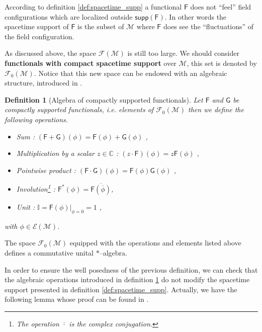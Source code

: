 \documentclass[11pt]{book}
\newcommand{\supp}{\mathsf{supp}}
\newcommand{\Ecal}{\mathcal{E}}
\newcommand{\Fcal}{\mathcal{F}}
\newcommand{\Mcal}{\mathcal{M}}
\newcommand{\Cbb}{\mathbb{C}}
\newcommand{\Ibb}{\mathbb{I}}
\newcommand{\Fsf}{\mathsf{F}}
\newcommand{\Gsf}{\mathsf{G}}
\theoremstyle{break}
\newtheorem{definition}{Definition}[chapter]
\begin{document}
According to definition \ref{def:spacetime_supp} a functional $\Fsf$ does not ``feel'' field configurations which are localized outside $\supp(\Fsf)$. In other words the spacetime support of $\Fsf$ is the subset of $\Mcal$ where $\Fsf$ does see the ``fluctuations'' of the field configuration.


As discussed above, the space $\Fcal(\Mcal)$ is still too large. We should consider \textbf{functionals with compact spacetime support} over $\Mcal$, this set is denoted by $\Fcal_0(\Mcal)$. Notice that this new space can be endowed with an algebraic structure, introduced in \cite{BFLR_2012}.


\begin{definition}[Algebra of compactly supported functionals] \label{def:algebra_comp_supp_func}
Let $\Fsf$ and $\Gsf$ be compactly supported functionals, i.e. elements of $\Fcal_0(\Mcal)$ then we define the following operations.
%
\begin{itemize}
\item Sum : $(\Fsf+\Gsf)(\phi) = \Fsf(\phi) + \Gsf(\phi)$ ,
\item Multiplication by a scalar $z\in\Cbb$ : $(z \cdot \Fsf)(\phi) = z \Fsf(\phi)$ ,
\item Pointwise product : $(\Fsf \cdot \Gsf)(\phi) = \Fsf(\phi) \Gsf(\phi)$ ,
\item Involution\footnote{The operation $\overline{\cdot}$ is the complex conjugation.} : $\Fsf^\ast(\phi) = \overline{\Fsf(\overline{\phi})}$,
\item Unit : $\Ibb = \Fsf(\phi)\bigg\vert_{\phi=0} = 1$ ,
\end{itemize}
%
with $\phi \in \Ecal(\Mcal)$. 
\end{definition}


The space $\Fcal_0(\Mcal)$ equipped with the operations and elements listed above defines a commutative unital $\ast$--algebra.


In order to ensure the well posedness of the previous definition, we can check that the algebraic operations introduced in definition \ref{def:algebra_comp_supp_func} do not modify the spacetime support presented in definition \ref{def:spacetime_supp}. Actually, we have the following lemma whose proof can be found in  \cite{BFLR_2012}.
\end{document}
